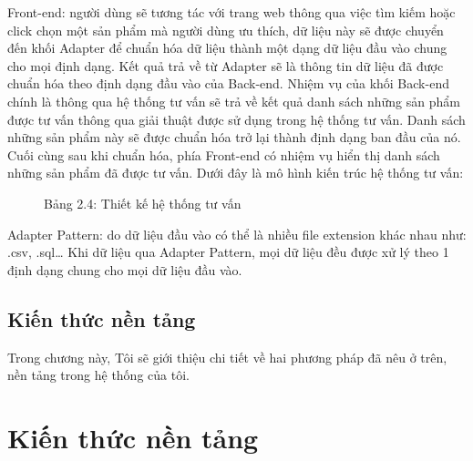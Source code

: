\documentclass[a4paper,12pt,numbered,print,index,custombib, oneside, custommargin]{report}
\begin{document}
Front-end: người dùng sẽ tương tác với trang web thông qua việc tìm kiếm hoặc click chọn một sản phẩm mà người dùng ưu thích, dữ liệu này sẽ được chuyển đến khối Adapter để chuẩn hóa dữ liệu thành một dạng dữ liệu đầu vào chung cho mọi định dạng. Kết quả trả về từ Adapter sẽ là thông tin dữ liệu đã được chuẩn hóa theo định dạng đầu vào của Back-end. Nhiệm vụ của khối Back-end chính là thông qua hệ thống tư vấn sẽ trả về kết quả danh sách những sản phẩm được tư vấn thông qua giải thuật được sử dụng trong hệ thống tư vấn. Danh sách những sản phẩm này sẽ được chuẩn hóa trở lại thành định dạng ban đầu của nó. Cuối cùng sau khi chuẩn hóa, phía Front-end có nhiệm vụ hiển thị danh sách những sản phẩm đã được tư vấn.
Dưới đây là mô hình kiến trúc hệ thống tư vấn:
\begin{figure}[h]
\centering
\caption{Bảng 2.4: Thiết kế hệ thống tư vấn}
\end{figure}

Adapter Pattern: do dữ liệu đầu vào có thể là nhiều file extension khác nhau như: .csv, .sql…
Khi dữ liệu qua Adapter Pattern, mọi dữ liệu đều được xử lý theo 1 định dạng chung cho mọi dữ liệu đầu vào.

\chapter{Kiến thức nền tảng}
Trong chương này, Tôi sẽ giới thiệu chi tiết về hai phương pháp đã nêu ở trên, nền tảng trong hệ thống của tôi. 
\part{Kiến thức nền tảng}
\end{document}
